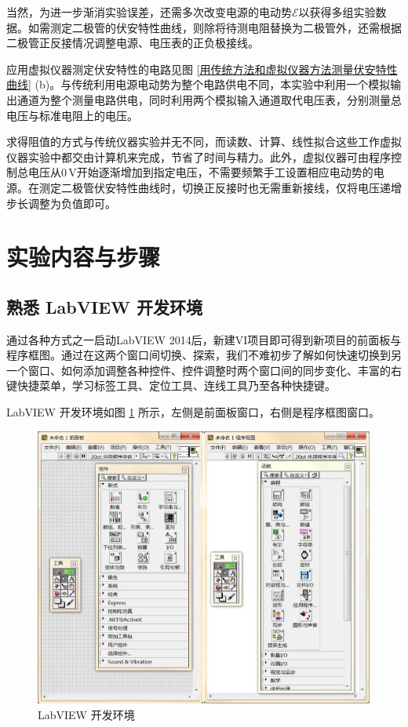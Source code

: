 \documentclass[UTF8]{article}
\theoremstyle{MyLineTheoremStyle} %
\theoremstyle{MyBlockTheoremStyle} %
\theoremstyle{MySubsubsectionStyle} %
\begin{document}
当然，为进一步渐消实验误差，还需多次改变电源的电动势$ \mathscr E $以获得多组实验数据。如需测定二极管的伏安特性曲线，则除将待测电阻替换为二极管外，还需根据二极管正反接情况调整电源、电压表的正负极接线。

应用虚拟仪器测定伏安特性的电路见图 \ref{用传统方法和虚拟仪器方法测量伏安特性曲线} (b)。与传统利用电源电动势为整个电路供电不同，本实验中利用一个模拟输出通道为整个测量电路供电，同时利用两个模拟输入通道取代电压表，分别测量总电压与标准电阻上的电压。

求得阻值的方式与传统仪器实验并无不同，而读数、计算、线性拟合这些工作虚拟仪器实验中都交由计算机来完成，节省了时间与精力。此外，虚拟仪器可由程序控制总电压从$ 0\,\mathrm V $开始逐渐增加到指定电压，不需要频繁手工设置相应电动势的电源。在测定二极管伏安特性曲线时，切换正反接时也无需重新接线，仅将电压递增步长调整为负值即可。


\section{实验内容与步骤}
\subsection{熟悉 LabVIEW 开发环境}
通过各种方式之一启动LabVIEW 2014后，新建VI项目即可得到新项目的前面板与程序框图。通过在这两个窗口间切换、探索，我们不难初步了解如何快速切换到另一个窗口、如何添加调整各种控件、控件调整时两个窗口间的同步变化、丰富的右键快捷菜单，学习标签工具、定位工具、连线工具乃至各种快捷键。

LabVIEW 开发环境如图 \ref{LabVIEW 开发环境} 所示，左侧是前面板窗口，右侧是程序框图窗口。

\begin{figure}[H]\centering
\includegraphics[width=0.75\columnwidth]{assets/LabVIEW开发环境.png}
\caption{LabVIEW 开发环境}\label{LabVIEW 开发环境}
\end{figure}
\end{document}
